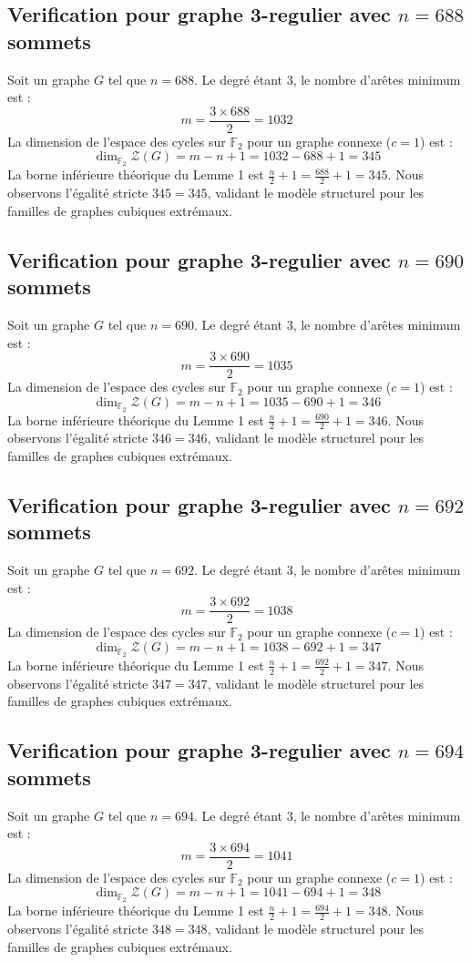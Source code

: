 \documentclass[11pt,a4paper]{article}
\begin{document}
\subsection{Verification pour graphe 3-regulier avec $n=688$ sommets}
Soit un graphe $G$ tel que $n = 688$. Le degré étant 3, le nombre d'arêtes minimum est :
$$ m = \frac{3 \times 688}{2} = 1032 $$
La dimension de l'espace des cycles sur $\mathbb{F}_2$ pour un graphe connexe ($c=1$) est :
$$ \dim_{\mathbb{F}_2} \mathcal{Z}(G) = m - n + 1 = 1032 - 688 + 1 = 345 $$
La borne inférieure théorique du Lemme 1 est $\frac{n}{2} + 1 = \frac{688}{2} + 1 = 345$.
Nous observons l'égalité stricte $345 = 345$, validant le modèle structurel pour les familles de graphes cubiques extrémaux.

\subsection{Verification pour graphe 3-regulier avec $n=690$ sommets}
Soit un graphe $G$ tel que $n = 690$. Le degré étant 3, le nombre d'arêtes minimum est :
$$ m = \frac{3 \times 690}{2} = 1035 $$
La dimension de l'espace des cycles sur $\mathbb{F}_2$ pour un graphe connexe ($c=1$) est :
$$ \dim_{\mathbb{F}_2} \mathcal{Z}(G) = m - n + 1 = 1035 - 690 + 1 = 346 $$
La borne inférieure théorique du Lemme 1 est $\frac{n}{2} + 1 = \frac{690}{2} + 1 = 346$.
Nous observons l'égalité stricte $346 = 346$, validant le modèle structurel pour les familles de graphes cubiques extrémaux.

\subsection{Verification pour graphe 3-regulier avec $n=692$ sommets}
Soit un graphe $G$ tel que $n = 692$. Le degré étant 3, le nombre d'arêtes minimum est :
$$ m = \frac{3 \times 692}{2} = 1038 $$
La dimension de l'espace des cycles sur $\mathbb{F}_2$ pour un graphe connexe ($c=1$) est :
$$ \dim_{\mathbb{F}_2} \mathcal{Z}(G) = m - n + 1 = 1038 - 692 + 1 = 347 $$
La borne inférieure théorique du Lemme 1 est $\frac{n}{2} + 1 = \frac{692}{2} + 1 = 347$.
Nous observons l'égalité stricte $347 = 347$, validant le modèle structurel pour les familles de graphes cubiques extrémaux.

\subsection{Verification pour graphe 3-regulier avec $n=694$ sommets}
Soit un graphe $G$ tel que $n = 694$. Le degré étant 3, le nombre d'arêtes minimum est :
$$ m = \frac{3 \times 694}{2} = 1041 $$
La dimension de l'espace des cycles sur $\mathbb{F}_2$ pour un graphe connexe ($c=1$) est :
$$ \dim_{\mathbb{F}_2} \mathcal{Z}(G) = m - n + 1 = 1041 - 694 + 1 = 348 $$
La borne inférieure théorique du Lemme 1 est $\frac{n}{2} + 1 = \frac{694}{2} + 1 = 348$.
Nous observons l'égalité stricte $348 = 348$, validant le modèle structurel pour les familles de graphes cubiques extrémaux.
\end{document}
